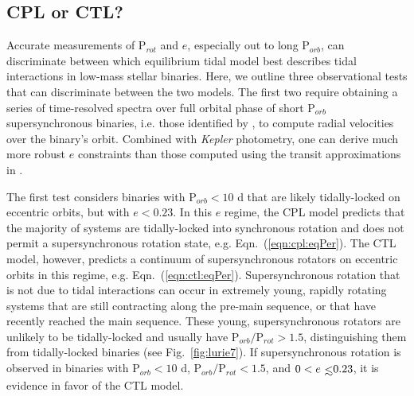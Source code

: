 \documentclass[twocolumn]{aastex61}
\def\lsim{~\rlap{$<$}{\lower 1.0ex\hbox{$\sim$}}}
\newcommand{\kepler}[0]{\textit{Kepler}\xspace}
\begin{document}

\subsection{CPL or CTL?} \label{sec:whichModel}

Accurate measurements of P$_{rot}$ and $e$, especially out to long P$_{orb}$, can discriminate between which equilibrium tidal model best describes tidal interactions in low-mass stellar binaries. Here, we outline three observational tests that can discriminate between the two models.  The first two require obtaining a series of time-resolved spectra over full orbital phase of short P$_{orb}$ supersynchronous binaries, i.e. those identified by \citet{Lurie2017}, to compute radial velocities over the binary's orbit.  Combined with \kepler photometry, one can derive much more robust $e$ constraints than those computed using the transit approximations in \citet{Lurie2017}. 

The first test considers binaries with P$_{orb} < 10$ d that are likely tidally-locked on eccentric orbits, but with $e < 0.23$.  In this $e$ regime, the CPL model predicts that the majority of systems are tidally-locked into synchronous rotation and does not permit a supersynchronous rotation state, e.g. Eqn.~(\ref{eqn:cpl:eqPer}). The CTL model, however, predicts a continuum of supersynchronous rotators on eccentric orbits in this regime, e.g. Eqn.~(\ref{eqn:ctl:eqPer}). Supersynchronous rotation that is not due to tidal interactions can occur in extremely young, rapidly rotating systems that are still contracting along the pre-main sequence, or that have recently reached the main sequence.  These young, supersynchronous rotators are unlikely to be tidally-locked and usually have P$_{orb}/$P$_{rot} > 1.5$, distinguishing them from tidally-locked binaries (see Fig.~\ref{fig:lurie7}).   If supersynchronous rotation is observed in binaries with P$_{orb} < 10$ d, P$_{orb}/$P$_{rot} < 1.5$, and $0 < e \lsim 0.23$, it is evidence in favor of the CTL model. 
\end{document}
